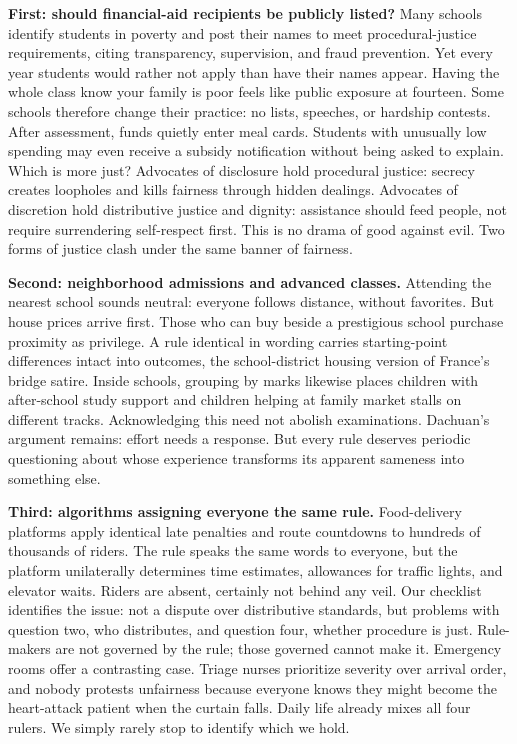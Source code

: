\textbf{First: should financial-aid recipients be publicly listed?} Many schools identify students in poverty and post their names to meet procedural-justice requirements, citing transparency, supervision, and fraud prevention. Yet every year students would rather not apply than have their names appear. Having the whole class know your family is poor feels like public exposure at fourteen. Some schools therefore change their practice: no lists, speeches, or hardship contests. After assessment, funds quietly enter meal cards. Students with unusually low spending may even receive a subsidy notification without being asked to explain. Which is more just? Advocates of disclosure hold procedural justice: secrecy creates loopholes and kills fairness through hidden dealings. Advocates of discretion hold distributive justice and dignity: assistance should feed people, not require surrendering self-respect first. This is no drama of good against evil. Two forms of justice clash under the same banner of fairness.

\textbf{Second: neighborhood admissions and advanced classes.} Attending the nearest school sounds neutral: everyone follows distance, without favorites. But house prices arrive first. Those who can buy beside a prestigious school purchase proximity as privilege. A rule identical in wording carries starting-point differences intact into outcomes, the school-district housing version of France's bridge satire. Inside schools, grouping by marks likewise places children with after-school study support and children helping at family market stalls on different tracks. Acknowledging this need not abolish examinations. Dachuan's argument remains: effort needs a response. But every rule deserves periodic questioning about whose experience transforms its apparent sameness into something else.

\textbf{Third: algorithms assigning everyone the same rule.} Food-delivery platforms apply identical late penalties and route countdowns to hundreds of thousands of riders. The rule speaks the same words to everyone, but the platform unilaterally determines time estimates, allowances for traffic lights, and elevator waits. Riders are absent, certainly not behind any veil. Our checklist identifies the issue: not a dispute over distributive standards, but problems with question two, who distributes, and question four, whether procedure is just. Rule-makers are not governed by the rule; those governed cannot make it. Emergency rooms offer a contrasting case. Triage nurses prioritize severity over arrival order, and nobody protests unfairness because everyone knows they might become the heart-attack patient when the curtain falls. Daily life already mixes all four rulers. We simply rarely stop to identify which we hold.

